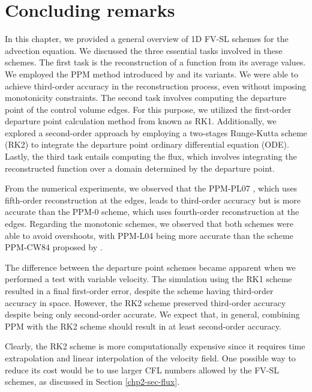 \section{Concluding remarks}
\label{chp2-sec-conclusion}
In this chapter, we provided a general overview of 1D FV-SL schemes for the advection equation.
We discussed the three essential tasks involved in these schemes.
The first task is the reconstruction of a function from its average values.
We employed the PPM method introduced by \citet{colella:1984} and its variants.
We were able to achieve third-order accuracy in the reconstruction process, even without imposing monotonicity constraints.
The second task involves computing the departure point of the control volume edges. For this purpose, 
we utilized the first-order departure point calculation method from \citet{colella:1984}  known as RK1.
Additionally, we explored a second-order approach by employing a two-stages Runge-Kutta scheme (RK2) 
to integrate the departure point ordinary differential equation (ODE).
Lastly, the third task entails computing the flux, which involves integrating the 
reconstructed function over a domain determined by the departure point.

From the numerical experiments, we observed that the PPM-PL07 \citep{putman:2007},
which uses fifth-order reconstruction at the edges, leads to third-order accuracy but is 
more accurate than the PPM-0 \citep{colella:1984} scheme, which uses fourth-order 
reconstruction at the edges.
Regarding the monotonic schemes, we observed that both schemes were able to avoid 
overshoots, with PPM-L04 \citep{lin:2004} being more accurate than the scheme
PPM-CW84 proposed by \citet{colella:1984}.

The difference between the departure point schemes became apparent when we performed a test 
with variable velocity. The simulation using the RK1 scheme resulted in a final first-order 
error, despite the scheme having third-order accuracy in space. However, the RK2 scheme 
preserved third-order accuracy despite being only second-order accurate. We expect that, in 
general, combining PPM with the RK2 scheme should result in at least second-order accuracy.

Clearly, the RK2 scheme is more computationally expensive since it requires time 
extrapolation and linear interpolation of the velocity field. One possible way to reduce 
its cost would be to use larger CFL numbers allowed by the FV-SL schemes, as discussed in 
Section \ref{chp2-sec-flux}.
